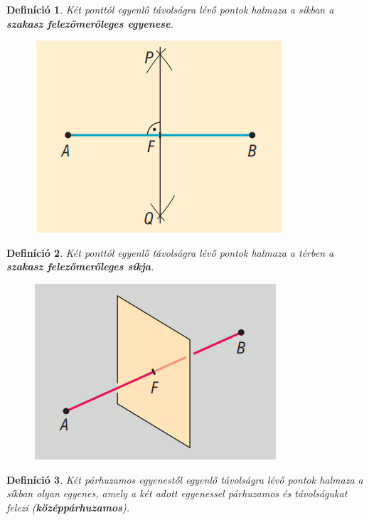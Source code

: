\documentclass[12pt,a4paper]{article}
\newtheorem{definition}{Definíció} [section]
\begin{document}
\begin{definition}
Két ponttól egyenlő távolságra lévő pontok halmaza a síkban a \textbf{szakasz felezőmerőleges egyenese}.
\begin{figure}[h]
\centering
\includegraphics[scale=0.35]{img/szakaszfelezo_meroleges}
\end{figure}
\end{definition}
\newpage
\begin{definition}
Két ponttól egyenlő távolságra lévő pontok halmaza a térben a \textbf{szakasz felezőmerőleges síkja}.
\begin{figure}[h]
\centering
\includegraphics[scale=0.35]{img/szakaszfelezo_meroleges_sik}
\end{figure}
\end{definition}

\begin{definition}
Két párhuzamos egyenestől egyenlő távolságra lévő pontok halmaza a síkban olyan egyenes, amely a két adott egyenessel párhuzamos és távolságukat felezi (\textbf{középpárhuzamos}).
\end{definition}
\end{document}
